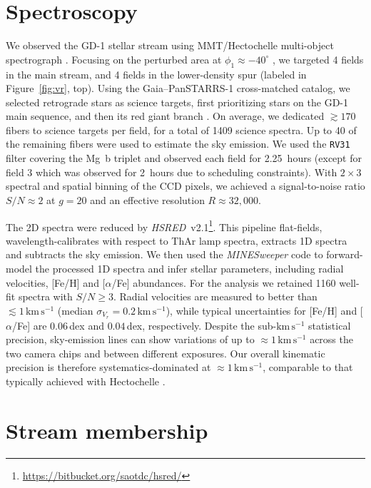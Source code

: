 \documentclass[twocolumn]{aastex63}
\newcommand{\package}[1]{\textsl{#1}}
\newcommand{\kms}{\ensuremath{\textrm{km}\,\textrm{s}^{-1}}}
\begin{document}
\section{Spectroscopy}
\label{sec:spec}

We observed the GD-1 stellar stream using MMT/Hectochelle multi-object spectrograph \citep{szentgyorgyi2011}.
Focusing on the perturbed area at $\phi_1\approx-40^\circ$ \citep[$\phi_{1,2}$ are coordinates oriented along and perpendicular to GD-1, respectively;][]{koposov2010}, we targeted 4 fields in the main stream, and 4 fields in the lower-density spur (labeled in Figure~\ref{fig:vr}, top).
Using the Gaia--PanSTARRS-1 cross-matched catalog, we selected retrograde stars as science targets, first prioritizing stars on the GD-1 main sequence, and then its red giant branch \citep[see][]{pwb}.
On average, we dedicated $\gtrsim170$ fibers to science targets per field, for a total of 1409 science spectra.
Up to 40 of the remaining fibers were used to estimate the sky emission.
We used the \texttt{RV31} filter covering the Mg~b triplet and observed each field for 2.25~hours (except for field 3 which was observed for 2~hours due to scheduling constraints).
With $2\times3$ spectral and spatial binning of the CCD pixels, we achieved a signal-to-noise ratio $S/N\approx2$ at $g=20$ and an effective resolution $R\approx32,000$.

The 2D spectra were reduced by \package{HSRED}~v2.1\footnote{\url{https://bitbucket.org/saotdc/hsred/}}.
This pipeline flat-fields, wavelength-calibrates with respect to ThAr lamp spectra, extracts 1D spectra and subtracts the sky emission.
We then used the \package{MINESweeper} code \citep{cargile2019} to forward-model the processed 1D spectra and infer stellar parameters, including radial velocities, [Fe/H] and [$\alpha$/Fe] abundances.
For the analysis we retained 1160 well-fit spectra with $S/N\geq3$.
Radial velocities are measured to better than $\lesssim1\,\kms$ (median $\sigma_{V_r}=0.2\,\kms$), while typical uncertainties for [Fe/H] and [$\alpha$/Fe] are $0.06$\,dex and $0.04$\,dex, respectively.
Despite the sub-$\kms$ statistical precision, sky-emission lines can show variations of up to $\approx1\,\kms$ across the two camera chips and between different exposures.
Our overall kinematic precision is therefore systematics-dominated at $\approx1\,\kms$, comparable to that typically achieved with Hectochelle \citep[e.g.,][]{caldwell2017}.

\section{Stream membership}
\label{sec:membership}
\end{document}
